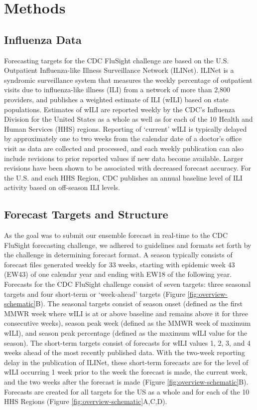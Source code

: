 \documentclass{article}\usepackage[]{graphicx}\usepackage[]{color}
\begin{document}
\section{Methods}

\subsection{Influenza Data}
Forecasting targets for the CDC FluSight challenge are based on the U.S. Outpatient Influenza-like Illness Surveillance Network (ILINet). 
ILINet is a syndromic surveillance system that measures the weekly percentage of outpatient visits due to influenza-like illness (ILI) from a network of more than 2,800 providers, and publishes a weighted estimate of ILI (wILI) based on state populations. 
Estimates of wILI are reported weekly by the CDC's Influenza Division for the United States as a whole as well as for each of the 10 Health and Human Services (HHS) regions. 
Reporting of `current' wILI is typically delayed by approximately one to two weeks from the calendar date of a doctor's office visit as data are collected and processed, and each weekly publication can also include revisions to prior reported values if new data become available. 
Larger revisions have been shown to be associated with decreased forecast accuracy.\cite{Reich2018}
For the U.S. and each HHS Region, CDC publishes an annual baseline level of ILI activity based on off-season ILI levels.\cite{surv2017} 

\subsection{Forecast Targets and Structure}
As the goal was to submit our ensemble forecast in real-time to the CDC FluSight forecasting challenge, we adhered to guidelines and formats set forth by the challenge in determining forecast format.
A season typically consists of forecast files generated weekly for 33 weeks, starting with epidemic week 43 (EW43) of one calendar year and ending with EW18 of the following year.
Forecasts for the CDC FluSight challenge consist of seven targets: three seasonal targets and four short-term or `week-ahead' targets (Figure \ref{fig:overview-schematic}B). The seasonal targets consist of season onset (defined as the first MMWR week where wILI is at or above baseline and remains above it for three consecutive weeks), season peak week (defined as the MMWR week of maximum wILI), and season peak percentage (defined as the maximum wILI value for the season). The short-term targets consist of forecasts for wILI values 1, 2, 3, and 4 weeks ahead of the most recently published data. With the two-week reporting delay in the publication of ILINet, these short-term forecasts are for the level of wILI occurring 1 week prior to the week the forecast is made, the current week, and the two weeks after the forecast is made (Figure \ref{fig:overview-schematic}B). Forecasts are created for all targets for the US as a whole and for each of the 10 HHS Regions (Figure \ref{fig:overview-schematic}A,C,D).
\end{document}

